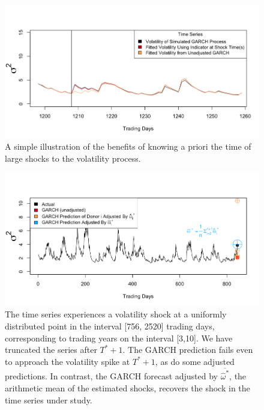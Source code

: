 \documentclass[11pt,3p,review,authoryear]{elsarticle}
\theoremstyle{definition}
\begin{document}
  \begin{figure}[h]
    \begin{center}
      \includegraphics[scale=.4]{simulation_plots/proof_concept.png}
      \caption{A simple illustration of the benefits of knowing a priori the time of large shocks to the volatility process.} 
      \label{fig:proof_concept}
      \end{center}
    \end{figure}

  \begin{figure}[h]
    \begin{center}
      \includegraphics[scale=.4]{simulation_plots/motivating_piece_arithmetic_mean.png}
      \caption{The time series experiences a volatility shock at a uniformly distributed point in the interval [756, 2520] trading days, corresponding to trading years on the interval [3,10].  We have truncated the series after $T^{*}+1$.  The GARCH prediction fails even to approach the volatility spike at $T^{*}+1$, as do some adjusted predictions.  In contrast, the GARCH forecast adjusted by $\overline{\hat\omega^{*}}$, the arithmetic mean of the estimated shocks, recovers the shock in the time series under study.} 
      \label{fig:arith_mean_example_introduction}
      \end{center}
    \end{figure}
\end{document}
